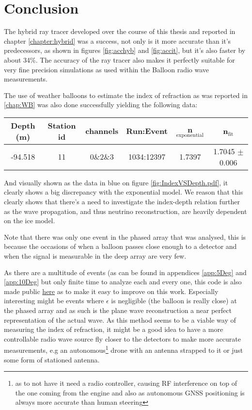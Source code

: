 \chapter*{Conclusion}
The hybrid ray tracer developed over the course of this thesis and reported in
chapter \ref{chapter:hybrid} was a success, not only is it more accurate than
it's predecessors, as shown in figures \ref{fig:acchyb} and \ref{fig:accit},
 but it's also faster by about 34\%.  The accuracy of the ray tracer also
makes it perfectly suitable for very fine precision simulations as used within
the Balloon radio wave measurements.

The use of weather balloons to estimate the index of refraction as
was reported in \ref{chap:WB} was also done successfully 
yielding the following data:
\begin{center}
\begin{tabular}{||c c c c c c||}
 \hline
 Depth (m) & Station id & channels & Run:Event & n$_\text{exponential}$ & n$_\text{fit}$\\ [0.5ex]
 \hline\hline
 -94.518 & 11 & 0\&2\&3 & 1034:12397 & 1.7397 & 1.7045 $\pm$ 0.006 \\
 \hline
\end{tabular}
\end{center}
And visually shown as the data in blue on figure \ref{fig:IndexVSDepth.pdf},
it clearly shows a big discrepancy with the exponential model.
We reason that this clearly shows that there's a need to investigate
the index-depth relation further as the wave propagation, and thus
neutrino reconstruction, are heavily dependent on the ice model.

Note that there was only one event in the phased array that was analysed, this 
is because the occasions of when a balloon passes close enough to a detector
and when the signal is measurable in the deep array are very few.

As there are a multitude of events (as can be found in appendices
\ref{app:5Deg} and \ref{app:10Deg} but only finite time to analyze each and
every one, this code is also made public
\href{https://github.com/arthuradriaens-code/projects-mt.git}{here} as to make
it easy to improve on this work.  Especially interesting might be events where
$\epsilon$ is negligible (the balloon is really close) at the phased array and
as such is the plane wave reconstruction a near perfect representation of the
actual wave.
\newpage
As this method seems to be a viable way of measuring the index of refraction,
it might be a good idea to have a more controllable radio wave source fly
closer to the detectors to make more accurate measurements, e.g an
autonomous\footnote{as to not have it need a radio controller, causing RF
interference on top of the one coming from the engine and also as autonomous
GNSS positioning is always more accurate than human steering} drone with an
antenna strapped to it or just some form of stationed antenna.  

